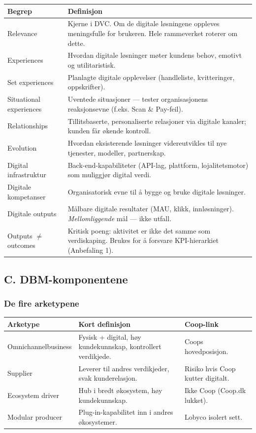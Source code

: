 \begin{tabular}{p{3.6cm}p{12cm}}
\hline
\textbf{Begrep} & \textbf{Definisjon} \\
\hline
Relevance & Kjerne i DVC. Om de digitale løsningene oppleves meningsfulle for
brukeren. Hele rammeverket roterer om dette. \\
\hline
Experiences & Hvordan digitale løsninger møter kundens behov, emotivt og
utilitaristisk. \\
\hline
Set experiences & Planlagte digitale opplevelser (handleliste, kvitteringer,
oppskrifter). \\
\hline
Situational experiences & Uventede situasjoner --- tester organisasjonens
reaksjonsevne (f.eks. Scan \& Pay-feil). \\
\hline
Relationships & Tillitsbaserte, personaliserte relasjoner via digitale kanaler;
kunden får økende kontroll. \\
\hline
Evolution & Hvordan eksisterende løsninger videreutvikles til nye tjenester,
modeller, partnerskap. \\
\hline
Digital infrastruktur & Back-end-kapabiliteter (API-lag, plattform,
lojalitetsmotor) som muliggjør digital verdi. \\
\hline
Digitale kompetanser & Organisatorisk evne til å bygge og bruke digitale
løsninger. \\
\hline
Digitale outputs & Målbare digitale resultater (MAU, klikk, innløsninger).
\emph{Mellomliggende} mål --- ikke utfall. \\
\hline
Outputs $\neq$ outcomes & Kritisk poeng: aktivitet er ikke det samme som
verdiskaping. Brukes for å forsvare KPI-hierarkiet (Anbefaling 1). \\
\hline
\end{tabular}

\subsection*{C. DBM-komponentene}

\subsubsection*{De fire arketypene}

\begin{tabular}{p{3.6cm}p{8.5cm}p{3.5cm}}
\hline
\textbf{Arketype} & \textbf{Kort definisjon} & \textbf{Coop-link} \\
\hline
Omnichannel\newline business & Fysisk + digital, høy kundekunnskap,
kontrollert verdikjede. & Coops hovedposisjon. \\
\hline
Supplier & Leverer til andres verdikjeder, svak kunderelasjon. & Risiko hvis
Coop kutter digitalt. \\
\hline
Ecosystem driver & Hub i bredt økosystem, høy kundekunnskap. & Ikke Coop
(Coop.dk lukket). \\
\hline
Modular producer & Plug-in-kapabilitet inn i andres økosystemer. & Lobyco
isolert sett. \\
\hline
\end{tabular}

